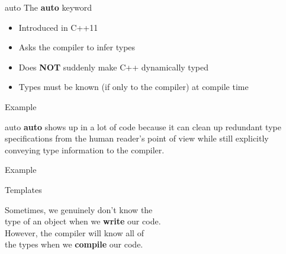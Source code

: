 \documentclass{beamer}
\begin{document}
	
	\begin{frame}{auto}
		The \textbf{auto} keyword
		\begin{itemize}
			\item Introduced in C++11
			\item Asks the compiler to infer types
			\item Does \textbf{NOT} suddenly make C++ dynamically typed
			\item Types must be known (if only to the compiler) at compile time
		\end{itemize}
		
		\begin{exampleblock}{Example}
		\lstI
		\end{exampleblock}
		
	\end{frame}
	
	
	\begin{frame}{auto}
		\textbf{auto} shows up in a lot of code because it can clean up redundant type specifications from the human reader's point of view while still explicitly conveying type information to the compiler.
		
		\begin{exampleblock}{Example}
			\lstI
		\end{exampleblock}
		
	\end{frame}
	
	\begin{frame}{Templates}
		\begin{center}
			Sometimes, we genuinely don't know the\\ 
			type of an object when we \textbf{write} our code.\\
			\bigskip
			However, the compiler will know all of\\ 
			the types when we \textbf{compile} our code.
		\end{center}
	\end{frame}
	
\end{document}
